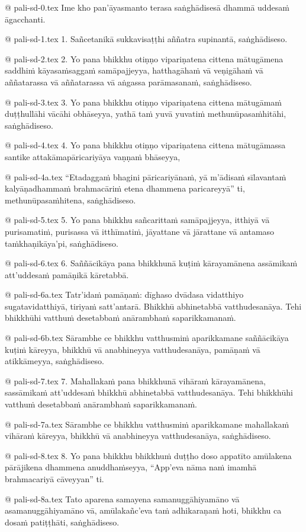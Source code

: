 @ pali-sd-0.tex
Ime kho pan’āyasmanto terasa saṅghādisesā dhammā uddesaṁ āgacchanti.

@ pali-sd-1.tex
1. Sañcetanikā sukkavisaṭṭhi aññatra supinantā, saṅghādiseso.

@ pali-sd-2.tex
2. Yo pana bhikkhu otiṇṇo vipariṇatena cittena mātugāmena saddhiṁ kāyasaṁsaggaṁ samāpajjeyya, hatthagāhaṁ vā veṇigāhaṁ vā aññatarassa vā aññatarassa vā aṅgassa parāmasanaṁ, saṅghādiseso.

@ pali-sd-3.tex
3. Yo pana bhikkhu otiṇṇo vipariṇatena cittena mātugāmaṁ duṭṭhullāhi vācāhi obhāseyya, yathā taṁ yuvā yuvatiṁ methunūpasaṁhitāhi, saṅghādiseso.

@ pali-sd-4.tex
4. Yo pana bhikkhu otiṇṇo vipariṇatena cittena mātugāmassa santike attakāmapāricariyāya vaṇṇaṁ bhāseyya, 

@ pali-sd-4a.tex
“Etadaggaṁ bhagini pāricariyānaṁ, yā m’ādisaṁ sīlavantaṁ kalyāṇadhammaṁ brahmacāriṁ etena dhammena paricareyyā” ti, methunūpasaṁhitena, saṅghādiseso.

@ pali-sd-5.tex
5. Yo pana bhikkhu sañcarittaṁ samāpajjeyya, itthiyā vā purisamatiṁ, purisassa vā itthīmatiṁ, jāyattane vā jārattane vā antamaso taṁkhaṇikāya’pi, saṅghādiseso.

@ pali-sd-6.tex
6. Saññācikāya pana bhikkhunā kuṭiṁ kārayamānena assāmikaṁ att’uddesaṁ pamāṇikā kāretabbā. 

@ pali-sd-6a.tex
Tatr’idaṁ pamāṇaṁ: dīghaso dvādasa vidatthiyo sugatavidatthiyā, tiriyaṁ satt’antarā. Bhikkhū abhinetabbā vatthudesanāya. Tehi bhikkhūhi vatthuṁ desetabbaṁ anārambhaṁ saparikkamanaṁ. 

@ pali-sd-6b.tex
Sārambhe ce bhikkhu vatthusmiṁ aparikkamane saññācikāya kuṭiṁ kāreyya, bhikkhū vā anabhineyya vatthudesanāya, pamāṇaṁ vā atikkāmeyya, saṅghādiseso.

@ pali-sd-7.tex
7. Mahallakaṁ pana bhikkhunā vihāraṁ kārayamānena, sassāmikaṁ att’uddesaṁ bhikkhū abhinetabbā vatthudesanāya. Tehi bhikkhūhi vatthuṁ desetabbaṁ anārambhaṁ saparikkamanaṁ.

@ pali-sd-7a.tex
Sārambhe ce bhikkhu vatthusmiṁ aparikkamane mahallakaṁ vihāraṁ kāreyya, bhikkhū vā anabhineyya vatthudesanāya, saṅghādiseso.

@ pali-sd-8.tex
8. Yo pana bhikkhu bhikkhuṁ duṭṭho doso appatīto amūlakena pārājikena dhammena anuddhaṁseyya, “App’eva nāma naṁ imamhā brahmacariyā cāveyyan” ti.

@ pali-sd-8a.tex
Tato aparena samayena samanuggāhiyamāno vā asamanuggāhiyamāno vā, amūlakañc’eva taṁ adhikaraṇaṁ hoti, bhikkhu ca dosaṁ patiṭṭhāti, saṅghādiseso.

